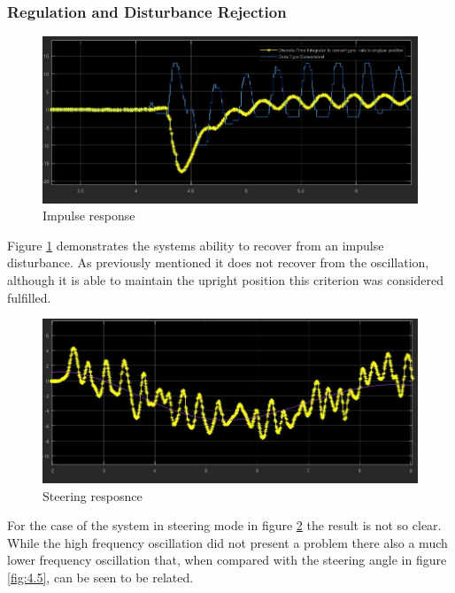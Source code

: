 \documentclass[11pt, a4paper,twocolumn]{article}
\begin{document}
            \subsubsection{Regulation and Disturbance Rejection}
	\begin{figure}[h!]
	\begin{center}
	\includegraphics[width=\linewidth]{ImpulseDisturbance}
	\caption{Impulse response}
	\label{fig:4.3}
	\end{center}
	\end{figure}
Figure \ref{fig:4.3} demonstrates the systems ability to recover from an impulse disturbance. As previously mentioned it does not recover from the oscillation, although it is able to maintain the upright position this criterion was considered fulfilled.

	\begin{figure}[h!]
	\begin{center}
	\includegraphics[width=\linewidth]{Steering}
	\caption{Steering resposnce}
	\label{fig:4.4}
	\end{center}
	\end{figure}
For the case of the system in steering mode in figure \ref{fig:4.4} the result is not so clear. While the high frequency oscillation did not present a problem there also a much lower frequency oscillation that, when compared with the steering angle in figure \ref{fig:4.5}, can be seen to be related.
\end{document}
